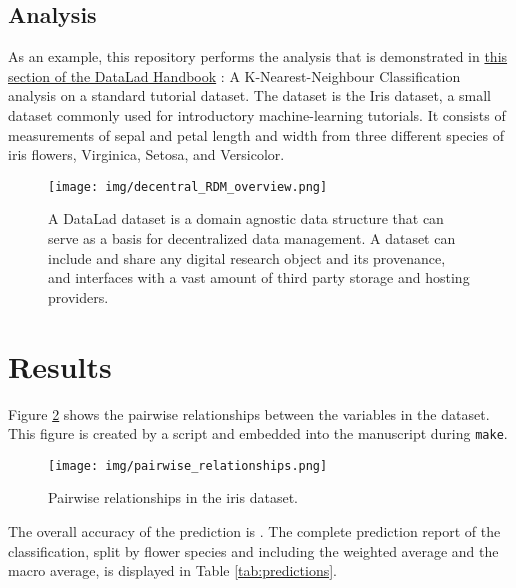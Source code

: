 \subsection*{Analysis}

As an example, this repository performs the analysis that is demonstrated in
\href{http://handbook.datalad.org/en/latest/basics/101-130-yodaproject.html}{this section of the DataLad Handbook}
\citep{handbook}:
A K-Nearest-Neighbour Classification analysis on a standard tutorial dataset.
The dataset is the Iris dataset, a small dataset commonly used for introductory
machine-learning tutorials.
It consists of measurements of sepal and petal length and width from three
different species of iris flowers, Virginica, Setosa, and Versicolor.

\begin{figure}
  \texttt{[image: img/decentral\_RDM\_overview.png]}
  \caption{A DataLad dataset is a domain agnostic data structure that can serve as
  a basis for decentralized data management.
  A dataset can include and share any digital research object and its provenance,
  and interfaces with a vast amount of third party storage and hosting providers.}
  \label{fig:RDM}
\end{figure}



\section*{Results}\label{res}

%
Figure \ref{fig:relation} shows the pairwise relationships between the variables in the dataset.
This figure is created by a script and embedded into the manuscript during \texttt{make}.

\begin{figure}
  \texttt{[image: img/pairwise\_relationships.png]} \\
  \caption{Pairwise relationships in the iris dataset.}
  \label{fig:relation}
\end{figure}

The overall accuracy of the prediction is \accuracy.
The complete prediction report of the classification, split by flower species
and including the weighted average and the macro average, is displayed in
Table \ref{tab:predictions}.

